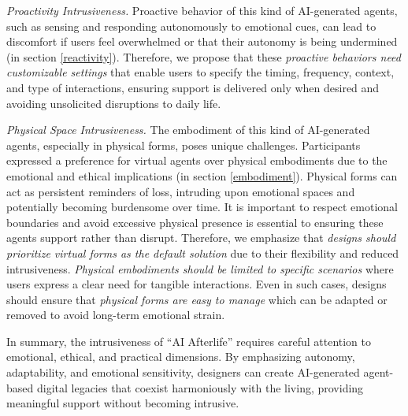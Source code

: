 \textit{Proactivity Intrusiveness.}
Proactive behavior of this kind of AI-generated agents, such as sensing and responding autonomously to emotional cues, can lead to discomfort if users feel overwhelmed or that their autonomy is being undermined (in section \ref{reactivity}). 
Therefore, we propose that these \textit{proactive behaviors need customizable settings} that enable users to specify the timing, frequency, context, and type of interactions, ensuring support is delivered only when desired and avoiding unsolicited disruptions to daily life.

\textit{Physical Space Intrusiveness.}
The embodiment of this kind of AI-generated agents, especially in physical forms, poses unique challenges. Participants expressed a preference for virtual agents over physical embodiments due to the emotional and ethical implications (in section \ref{embodiment}). Physical forms can act as persistent reminders of loss, intruding upon emotional spaces and potentially becoming burdensome over time. It is important to respect emotional boundaries and avoid excessive physical presence is essential to ensuring these agents support rather than disrupt.
Therefore, we emphasize that \textit{designs should prioritize virtual forms as the default solution} due to their flexibility and reduced intrusiveness. \textit{Physical embodiments should be limited to specific scenarios} where users express a clear need for tangible interactions. Even in such cases, designs should ensure that \textit{physical forms are easy to manage} which can be adapted or removed to avoid long-term emotional strain.

In summary, the intrusiveness of ``AI Afterlife'' requires careful attention to emotional, ethical, and practical dimensions. By emphasizing autonomy, adaptability, and emotional sensitivity, designers can create AI-generated agent-based digital legacies that coexist harmoniously with the living, providing meaningful support without becoming intrusive.  